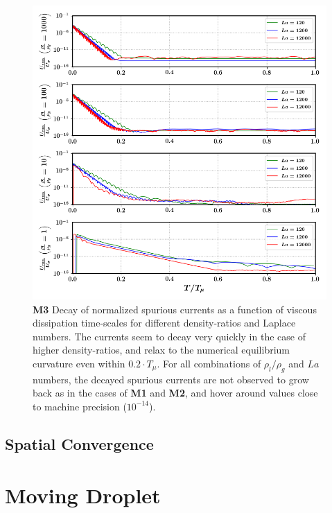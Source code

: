 \begin{figure}[h!]
    \centering
    \includegraphics[]{plots/static_drop/decay_sagar.png}
	\caption{\textbf{M3} Decay of normalized spurious currents as a function of viscous dissipation time-scales for different density-ratios and Laplace numbers. The currents seem to decay very quickly in the case of higher density-ratios, and relax to the numerical equilibrium curvature even within $0.2 \cdot T_\mu$. For all combinations of $\rho_l / \rho_g$ and $La$ numbers, the decayed spurious currents are not observed to grow back as in the cases of \textbf{M1} and \textbf{M2}, and hover around values close to machine precision ($10^{-14}$).}   
    \label{decay_sagar}
\end{figure}



\subsection*{Spatial Convergence}
\blindtext


\section{Moving Droplet}

